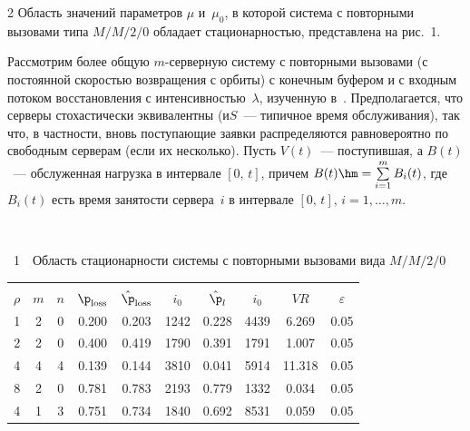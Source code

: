\begin{multicols}{2}
Область значений параметров $\mu$ и~$\mu_0$,  в которой сис\-те\-ма с
повторными вызовами типа  $M/M/2/0$ обладает стационарностью, представлена на рис.~1.


Рассмотрим  более общую  $m$-сер\-вер\-ную сис\-те\-му с повторными вызовами
(с постоянной ско\-ростью возвращения с орбиты) с конечным буфером  и
с входным потоком восстановления с интенсив\-ностью~$\lambda$,
изученную в~\cite{Avr}.  Предполагается, что
  серверы стохастически
эквивалентны (и\linebreak $S$~--- ти\-пич\-ное  время обслуживания), так что, в
частности, вновь поступающие заявки распределяются  равновероятно по
свободным серверам (если их несколько).  Пусть $V(t)$~--- поступившая,
 а  $B(t)$~--- обслуженная нагрузка  в интервале $[0,\,t]$, причем
$B(t)\hm=\sum\limits_{i=1}^mB_i(t)$, где $B_i(t)$ есть время занятости сервера~$i$ 
в интервале $[0,\,t]$, $i=1,\ldots,m$. \linebreak\vspace*{-12pt}
\vspace*{2pt}
\begin{center}  %
 \mbox{%
 \epsfxsize=77.686mm
 }
 \end{center}
{{\figurename~1}\ \ \small{Область  стационарности  системы с повторными
вызовами вида  $M/M/2/0$}}




\vspace*{12pt}

\addtocounter{figure}{1}


\begin{table}[b]\small
\vspace*{-12pt}
\begin{center} 
\vspace*{2ex}

\begin{tabular}{|c|c|c|c|c|c|c|c|c|c|} 
\hline
&&&&&&&&&\\[-9pt]
 $\rho$ & $m$   &$n$   &  $\p_{\mathrm{loss}}$ & $\hat{\p}_{\mathrm{loss}}$ &  $i_0$  &
 $\hat{\p}_l$  &  $i_0$& $VR$& $\varepsilon$ \\
 \hline
1& 2& 0& 0.200& 0.203& 1242& 0.228& 4439& 6.269& 0.05\\ 
2& 2& 0& 0.400& 0.419&1790& 0.391& 1791& 1.007& 0.05\\ 
4& 4& 4& 0.139 & 0.144& 3810& 0.041& 5914&11.318& 0.05\\
8& 2& 0& 0.781& 0.783& 2193& 0.779& 1332& 0.034& 0.05\\
4& 1& 3& 0.751& 0.734& 1840& 0.692& 8531& 0.059& 0.05\\
 \hline 
 \end{tabular} 
 \end{center} 
 \end{table}


\end{multicols}
